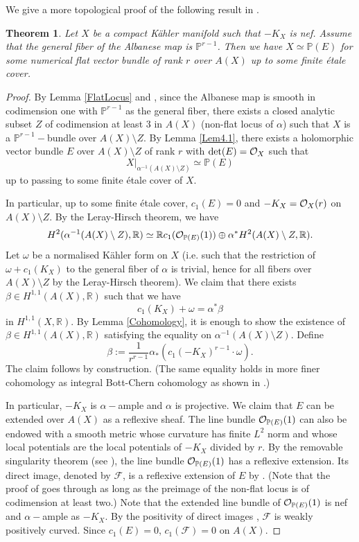 \documentclass[a4, 12pt]{amsart}
\newtheorem{thm}{Theorem}[section]
\numberwithin{equation}{section}
\theoremstyle{definition}
\def\R{\mathbb{R}}
\def\P{\mathbb{P}}
\def\cF{\mathcal{F}}
\def\P{\mathbb{P}}
\def \det{\mathrm{det}}
\begin{document}
We give a more topological proof of the following result in \cite{CH17}.
\begin{thm}\label{Proj}
Let $X$ be a compact K\"ahler manifold such that 
$-K_X$ is nef.
Assume that the general fiber of the Albanese map is $\P^{r-1}$.
Then we have $X \simeq \P(E)$ for some numerical flat vector bundle of rank $r$ over $A(X)$ up to some finite \'etale cover.
\end{thm}
\begin{proof}
By Lemma \ref{FlatLocus} and \cite{ARM14}, since the Albanese map is smooth in codimension one with $\P^{r-1}$ as the general fiber, there exists a closed analytic subset $Z$ of codimension at least 3 in $A(X)$  (non-flat locus of $\alpha$) such that $X$ is a $\P^{r-1}-$bundle over $A(X) \setminus Z$.
By Lemma \ref{Lem4.1}, there exists a holomorphic vector bundle $E$ over $A(X) \setminus Z$ of rank $r$ with $\det(E)=\cO_X$ such that
$$X|_{\alpha^{-1}(A(X) \setminus Z)} \simeq \P(E)$$
up to passing to some finite \'etale cover of $X$.


In particular, up to some finite \'etale cover, $c_1(E)=0$ and $-K_X=\mathcal{O}_{X}(r)$ on $A(X) \setminus Z$.
By the Leray-Hirsch theorem,
 we have
$$H^{2}(\alpha^{-1}(A(X) \setminus Z), \R) \simeq \R c_1(\cO_{\P(E)}(1)) \oplus \alpha^* H^{2}(A(X) \setminus Z, \R).$$
Let $\omega$ be a normalised K\"ahler form on $X$  (i.e. such that the restriction of $\omega+c_1(K_X)$ to the general fiber of $\alpha$ is trivial, hence for all fibers over $A(X) \setminus Z$ by the Leray-Hirsch theorem).
We claim that
there exists $\beta \in H^{1,1}(A(X), \R)$ such that we have 
$$c_1(K_X)+ \omega=\alpha^* \beta$$
in $H^{1,1}(X, \R)$.
By Lemma \ref{Cohomology}, it is enough to show the existence of $\beta \in H^{1,1}(A(X), \R)$ satisfying the equality on $\alpha^{-1}(A(X) \setminus Z)$.
Define
$$\beta:= \frac{1}{r^{r-1}} \alpha_*(c_1(-K_X)^{r-1} \cdot \omega).$$
The claim follows by construction.
(The same equality holds in more finer cohomology as integral Bott-Chern cohomology as shown in \cite{Wu19a}.)

In particular, $-K_X$ is $\alpha-$ample and $\alpha$ is projective.
We claim that $E$ can be extended over $A(X)$ as a reflexive sheaf.
The line bundle $\cO_{\P(E)}(1)$ can also be endowed with a smooth metric whose curvature has finite $L^2$ norm and whose local potentials
are the local potentials of $-K_{X}$ divided by $r$.
By the removable singularity theorem
(see \cite[Lemma 1]{BS94}),
the line bundle $\cO_{\P(E)}(1)$ has a reflexive extension. Its direct image, denoted by $\cF$,  is a reflexive extension of $E$ by \cite[Cor.1.7]{Har80}. (Note that the proof of \cite{Har80} goes through as long as the preimage of the non-flat locus is of codimension at least two.)
Note that the extended line bundle of $
\cO_{\P(E)}(1)$ is nef and $\alpha-$ample as $-K_X$.
By the positivity of direct images \cite[Proposition 2.6]{MW23},
$\cF$ is weakly positively curved.
Since $c_1(E)=0$, $c_1(\cF)=0$ on $A(X)$.


\end{proof}
\end{document}
